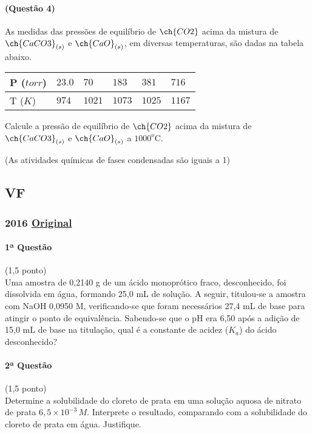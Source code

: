 \documentclass[12pt,a4paper]{article}
\newcommand{\original}[1]{\tiny \href{#1}{Original} \normalsize}
\begin{document}
\paragraph{(Questão 4)} As medidas das pressões de equilíbrio de $\ch{CO2}$ acima da mistura de $\ch{CaCO3}_{(s)}$ e $\ch{CaO}_{(s)}$, em diversas temperaturas, são dadas na tabela abaixo. 

\begin{center}
\begin{tabular}{l|l|l|l|l|l}
P ($torr$) & $23.0$ & $70$ & $183$ & $381$ & $716$   \\ \hline
T ($K$) & $974$ & $1021$ & $1073$ & $1025$ & $1167$   \\
\end{tabular}
\end{center}
 
 
Calcule a pressão de equilíbrio de $\ch{CO2}$ acima da mistura de $\ch{CaCO3}_{(s)}$ e $\ch{CaO}_{(s)}$ a $1000^o$C. 

(As atividades químicas de fases condensadas são iguais a 1)

\newpage

\subsection{VF}
\subsubsection{2016 \original{https://drive.google.com/file/d/1QhUJZqqem5bCbO-MFvVVdQRbjgOULufv/view?usp=sharing}}

\paragraph{1ª Questão} (1,5 ponto)\\
Uma amostra de 0,2140 g de um ácido monoprótico fraco, desconhecido, foi dissolvida em água, formando 25,0 mL de solução. A seguir, titulou-se a amostra com NaOH 0,0950 M, verificando-se que foram necessários 27,4 mL de base para atingir o ponto de equivalência. Sabendo-se que o pH era 6,50 após a adição de 15,0 mL de base na titulação, qual é a constante de acidez ($K_a$) do ácido desconhecido?

\paragraph{2ª Questão} (1,5 ponto)\\
Determine a solubilidade do cloreto de prata em uma solução aquosa de nitrato de prata $6,5 \times 10^{-3}\,M$. Interprete o resultado, comparando com a solubilidade do cloreto de prata em água. Justifique.
\end{document}
